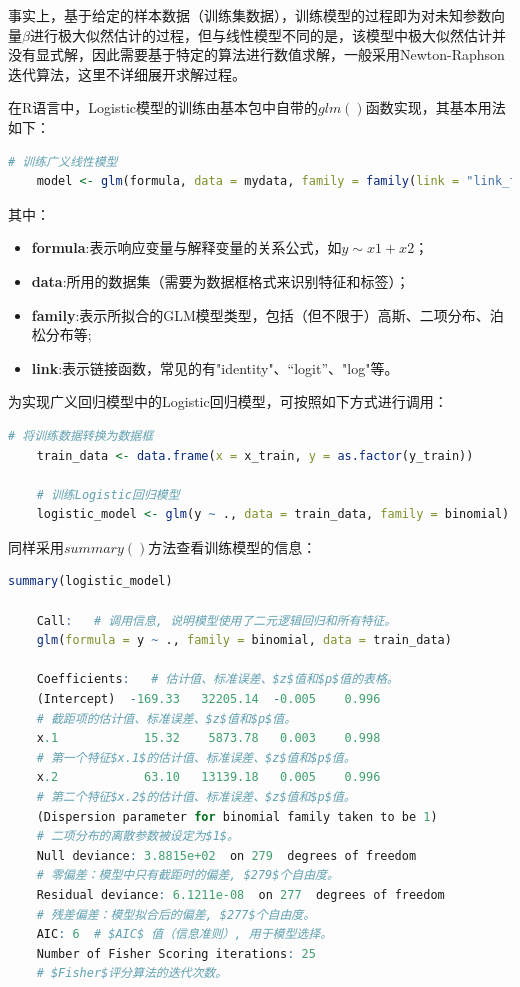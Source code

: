 \documentclass[12pt]{article}  %
\begin{document}
事实上，基于给定的样本数据（训练集数据），训练模型的过程即为对未知参数向量$\beta$进行极大似然估计的过程，但与线性模型不同的是，该模型中极大似然估计并没有显式解，因此需要基于特定的算法进行数值求解，一般采用Newton-Raphson迭代算法，这里不详细展开求解过程。

在R语言中，Logistic模型的训练由基本包中自带的$glm()$函数实现，其基本用法如下：
\begin{lstlisting}[language=R]
	# 训练广义线性模型
	model <- glm(formula, data = mydata, family = family(link = "link_function"))
\end{lstlisting}

其中：
\begin{itemize}
	\setlength{\parsep}{0ex} %
	\setlength{\topsep}{2ex} %
	\setlength{\itemsep}{1ex} %
	\item \textbf{formula}:表示响应变量与解释变量的关系公式，如$y \sim x1 + x2$；		
	\item \textbf{data}:所用的数据集（需要为数据框格式来识别特征和标签）；
	\item \textbf{family}:表示所拟合的GLM模型类型，包括（但不限于）高斯、二项分布、泊松分布等;
	\item \textbf{link}:表示链接函数，常见的有"identity"、“logit”、"log"等。
\end{itemize}

为实现广义回归模型中的Logistic回归模型，可按照如下方式进行调用：
\begin{lstlisting}[language=R]
	# 将训练数据转换为数据框
	train_data <- data.frame(x = x_train, y = as.factor(y_train))
	
	# 训练Logistic回归模型
	logistic_model <- glm(y ~ ., data = train_data, family = binomial)
\end{lstlisting}

同样采用$summary()$方法查看训练模型的信息：

\begin{lstlisting}[language=R]
	summary(logistic_model)
	
	Call:   # 调用信息, 说明模型使用了二元逻辑回归和所有特征。
	glm(formula = y ~ ., family = binomial, data = train_data)
	
	Coefficients:   # 估计值、标准误差、$z$值和$p$值的表格。
	(Intercept)  -169.33   32205.14  -0.005    0.996
	# 截距项的估计值、标准误差、$z$值和$p$值。
	x.1            15.32    5873.78   0.003    0.998
	# 第一个特征$x.1$的估计值、标准误差、$z$值和$p$值。
	x.2            63.10   13139.18   0.005    0.996
	# 第二个特征$x.2$的估计值、标准误差、$z$值和$p$值。
	(Dispersion parameter for binomial family taken to be 1)
	# 二项分布的离散参数被设定为$1$。
	Null deviance: 3.8815e+02  on 279  degrees of freedom
	# 零偏差：模型中只有截距时的偏差, $279$个自由度。
	Residual deviance: 6.1211e-08  on 277  degrees of freedom
	# 残差偏差：模型拟合后的偏差, $277$个自由度。
	AIC: 6	# $AIC$ 值（信息准则）, 用于模型选择。
	Number of Fisher Scoring iterations: 25   
	# $Fisher$评分算法的迭代次数。
\end{lstlisting}
\end{document}
